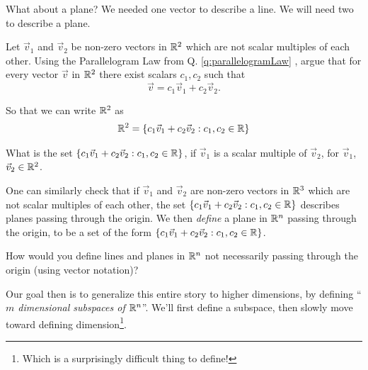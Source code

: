What about a plane? We needed one vector to describe a line. We will need two to describe a plane.

\begin{qbox}
  \label{q:planeAsSpan}
    Let $\vec{v}_1$ and $\vec{v}_2$ be non-zero vectors in $\mathbb{R}^2$ which are not scalar multiples of each other.
    Using the Parallelogram Law from Q. \ref{q:parallelogramLaw} , argue that for every vector $\vec{v}$ in $\mathbb{R}^2$ there exist scalars $c_1, c_2$ such that \begin{equation*}
      \vec{v} = c_1 \vec{v}_1 + c_2 \vec{v}_2.
  \end{equation*}
    \begin{figure}[H]
      
    \end{figure}
    So that we can write $\mathbb{R}^2$ as
    \begin{align*}
      \mathbb{R}^2 = \left\{c_1 \vec{v}_1 + c_2 \vec{v}_2 : c_1, c_2 \in \mathbb{R}\right\}
    \end{align*}
\end{qbox}
\begin{qbox}
  What is the set $\left\{c_1 \vec{v}_1 + c_2 \vec{v}_2 : c_1, c_2 \in \mathbb{R}\right\}$, if $\vec{v}_1$ is a scalar multiple of $\vec{v}_2$, for $\vec{v}_1$, $\vec{v}_2 \in \mathbb{R}^2$.
\end{qbox}

One can similarly check that if $\vec{v}_1$ and $\vec{v}_2$ are non-zero vectors in $\mathbb{R}^3$ which are not scalar multiples of each other, the set $\left\{c_1 \vec{v}_1 + c_2 \vec{v}_2 : c_1, c_2 \in \mathbb{R}\right\}$ describes planes passing through the origin.
We then \emph{define} a plane in $\mathbb{R}^n$ passing through the origin, to be a set of the form $\left\{c_1 \vec{v}_1 + c_2 \vec{v}_2 : c_1, c_2 \in \mathbb{R}\right\}$.

\begin{qbox}
  How would you define lines and planes in $\mathbb{R}^n$ not necessarily passing through the origin (using vector notation)?
\end{qbox}

Our goal then is to generalize this entire story to higher dimensions, by defining ``\emph{$m$ dimensional subspaces of $\mathbb{R}^n$}''.
We'll first define a subspace, then slowly move toward defining dimension\footnote{Which is a surprisingly difficult thing to define!}.












